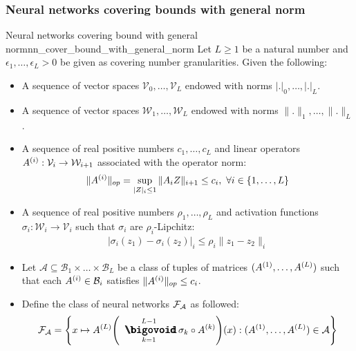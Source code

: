 \subsubsection{Neural networks covering bounds with general norm}
\begin{theorem}{Neural networks covering bound with general norm}{nn_cover_bound_with_general_norm}
    Let $L \ge 1$ be a natural number and $\epsilon_1, \dots, \epsilon_L > 0$ be given as covering number granularities. Given the following:
    \begin{itemize}
        \item A sequence of vector spaces $\mathcal{V}_0, \dots, \mathcal{V}_L$ endowed with norms $|.|_0, \dots, |.|_L$.
        \item A sequence of vector spaces $\mathcal{W}_1, \dots, \mathcal{W}_L$ endowed with norms $\|.\|_1, \dots, \|.\|_L$.
        \item A sequence of real positive numbers $c_1, \dots, c_L$ and linear operators $A^{(i)} : \mathcal{V}_i \to \mathcal{W}_{i+1}$ associated with the operator norm:
        \begin{align*}
            \|A^{(i)}\|_{op} = \sup_{|Z|_i \le 1} \|A_iZ\|_{i+1} \le c_i, \ \forall i \in \{1, \dots, L\}
        \end{align*}

        \item A sequence of real positive numbers $\rho_1, \dots, \rho_L$ and activation functions $\sigma_i:\mathcal{W}_i \to \mathcal{V}_i$ such that $\sigma_i$ are $\rho_i$-Lipchitz:
        \begin{align*}
            |\sigma_i(z_1) - \sigma_i(z_2)|_i \le \rho_i\|z_1 - z_2\|_i
        \end{align*}

        \item Let $\mathcal{A}\subseteq \mathcal{B}_1\times\dots\times\mathcal{B}_L$ be a class of tuples of matrices $(A^{(1)}, \dots, A^{(L)})$ such that each $A^{(i)} \in \mathcal{B}_i$ satisfies $\|A^{(i)}\|_{op} \le c_i$.

        \item Define the class of neural networks $\mathcal{F}_\mathcal{A}$ as followed:
        \begin{align*}
            \F_\mathcal{A} = \biggCurl{
                x\mapsto \A{L}\biggRound{
                    \bigO_{k=1}^{L-1}\sigma_k \circ \A{k}
                }(x) : (\A{1}, \dots, \A{L}) \in \mathcal{A}
            }
        \end{align*}
        

\end{itemize}
\end{theorem}
